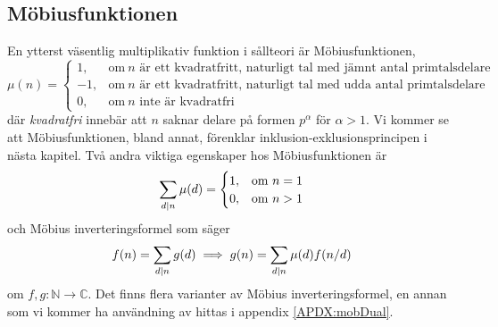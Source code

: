 \subsection{Möbiusfunktionen} \label{Mobius}
En ytterst väsentlig multiplikativ funktion i sållteori är Möbiusfunktionen,
\begin{equation*}
    \mu(n) = 
    \begin{cases}
        1, & \text{om}\ n \text{ är ett kvadratfritt, naturligt tal med jämnt antal primtalsdelare}\\
        -1, & \text{om}\ n \text{ är ett kvadratfritt, naturligt tal med udda antal primtalsdelare}\\
        0, & \text{om}\ n \text{ inte är kvadratfri}
    \end{cases}
\end{equation*}
där \textit{kvadratfri} innebär att $n$ saknar delare på formen \(p^\alpha\) för \(\alpha > 1\). Vi kommer se att Möbiusfunktionen, bland annat, förenklar inklusion-exklusionsprincipen i nästa kapitel. Två andra viktiga egenskaper hos Möbiusfunktionen är
\begin{equation*}
    \sum_{d \mid n} \mu(d) =
    \begin{cases}
        1, & \text{om}\ n = 1 \\
        0, & \text{om}\ n > 1
    \end{cases}
\end{equation*}
och Möbius inverteringsformel som säger
\begin{equation} \label{mobiusinv}
    f(n) = \sum_{d \mid n} g(d) \implies g(n) = \sum_{d \mid n} \mu(d) f(n/d)
\end{equation}
om \(f, g : \mathbb{N} \to \mathbb{C}\). Det finns flera varianter av Möbius inverteringsformel, en annan som vi kommer ha användning av hittas i appendix \ref{APDX:mobDual}.



